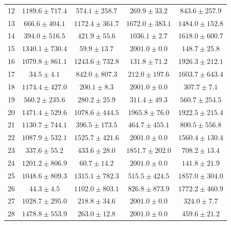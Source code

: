 \documentclass[conference]{IEEEtran}
\begin{document}
\begin{table}[!t]
\begin{tabular}{rcccc}
12 & $1189.6 \pm 717.4$  & $574.1  \pm 258.7$ & $\bm{269.9  \pm 33.2}$  & $843.6  \pm 257.9$ \\
13 & $\bm{666.6 \pm 404.1}$   & $1172.4 \pm 361.7$ & $1672.0 \pm 383.1$ & $1484.0 \pm 152.8$ \\
14 & $\bm{394.0 \pm 516.5}$   & $421.9  \pm 55.6$  & $1036.1 \pm 2.7$   & $1618.0 \pm 600.7$ \\
15 & $1340.1 \pm 730.4$  & $\bm{59.9   \pm 13.7}$  & $2001.0 \pm 0.0$   & $148.7  \pm 25.8$  \\
16 & $1079.8 \pm 861.1$  & $1243.6 \pm 732.8$ & $\bm{131.8  \pm 71.2}$  & $1926.3 \pm 212.1$ \\
17 & $\bm{34.5 \pm 4.1}$      & $842.0  \pm 807.3$ & $212.0  \pm 197.6$ & $1603.7 \pm 643.4$ \\
18 & $1174.4 \pm 427.0$  & $\bm{200.1  \pm 8.3}$   & $2001.0 \pm 0.0$   & $307.7  \pm 7.1$   \\
19 & $560.2 \pm 235.6$   & $\bm{280.2  \pm 25.9}$  & $311.4  \pm 49.3$  & $560.7  \pm 254.5$ \\
20 & $1471.4 \pm 529.6$  & $\bm{1078.6 \pm 444.5}$ & $1965.8 \pm 76.0$  & $1922.5 \pm 215.4$ \\
21 & $1130.7 \pm 744.1$  & $\bm{396.5  \pm 173.5}$ & $464.7  \pm 455.1$ & $800.5  \pm 556.8$ \\
22 & $\bm{1087.9 \pm 532.1}$  & $1525.7 \pm 421.6$ & $2001.0 \pm 0.0$   & $1560.4 \pm 130.4$ \\
23 & $\bm{337.6 \pm 55.2}$    & $433.6  \pm 28.0$  & $1851.7 \pm 202.0$ & $708.2  \pm 13.4$  \\
24 & $1201.2 \pm 806.9$  & $\bm{60.7   \pm 14.2}$  & $2001.0 \pm 0.0$   & $141.8  \pm 21.9$  \\
25 & $1048.6 \pm 809.3$  & $1315.1 \pm 782.3$ & $\bm{515.5  \pm 424.5}$ & $1857.0 \pm 304.0$ \\
26 & $\bm{44.3 \pm 4.5}$      & $1102.0 \pm 803.1$ & $826.8  \pm 873.9$ & $1772.2 \pm 460.9$ \\
27 & $1028.7 \pm 295.0$  & $\bm{218.8  \pm 34.6}$  & $2001.0 \pm 0.0$   & $324.0  \pm 7.7$   \\
28 & $1478.8 \pm 553.9$  & $\bm{263.0  \pm 12.8}$  & $2001.0 \pm 0.0$   & $459.6  \pm 21.2$  \\
\bottomrule
\end{tabular}
\end{table}
\end{document}
